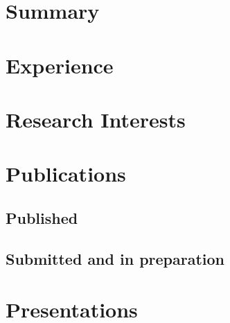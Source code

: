 \documentclass[letterpaper]{twentysecondcv} %
\begin{document}
\makeprofile %
 

\section{Summary}

\section{Experience}

\begin{twenty} %
\end{twenty}

\vspace{-12pt}
\section{Research Interests}
\begin{itemize}
\end{itemize}

\section{Publications}
\subsection{Published}
\begin{itemize}
\end{itemize}

\subsection{Submitted and in preparation}
\begin{itemize}
\end{itemize}

\section{Presentations}
\begin{twenty}
\end{twenty}
\end{document}
